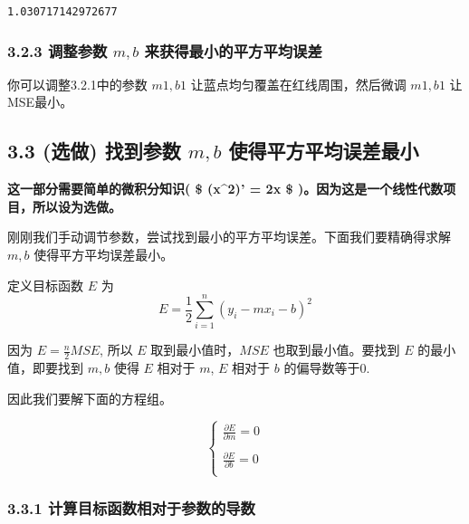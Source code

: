 \documentclass[11pt]{article}
\begin{document}
    \begin{Verbatim}[commandchars=\\\{\}]
1.030717142972677

    \end{Verbatim}

    \subsubsection{\texorpdfstring{3.2.3 调整参数 \(m, b\)
来获得最小的平方平均误差}{3.2.3 调整参数 m, b 来获得最小的平方平均误差}}\label{ux8c03ux6574ux53c2ux6570-m-b-ux6765ux83b7ux5f97ux6700ux5c0fux7684ux5e73ux65b9ux5e73ux5747ux8befux5dee}

你可以调整3.2.1中的参数 \(m1,b1\) 让蓝点均匀覆盖在红线周围，然后微调
\(m1, b1\) 让MSE最小。

    \subsection{\texorpdfstring{3.3 (选做) 找到参数 \(m, b\)
使得平方平均误差最小}{3.3 (选做) 找到参数 m, b 使得平方平均误差最小}}\label{ux9009ux505a-ux627eux5230ux53c2ux6570-m-b-ux4f7fux5f97ux5e73ux65b9ux5e73ux5747ux8befux5deeux6700ux5c0f}

\textbf{这一部分需要简单的微积分知识( \$ (x\^{}2)' = 2x \$
)。因为这是一个线性代数项目，所以设为选做。}

刚刚我们手动调节参数，尝试找到最小的平方平均误差。下面我们要精确得求解
\(m, b\) 使得平方平均误差最小。

定义目标函数 \(E\) 为 \[
E = \frac{1}{2}\sum_{i=1}^{n}{(y_i - mx_i - b)^2}
\]

因为 \(E = \frac{n}{2}MSE\), 所以 \(E\) 取到最小值时，\(MSE\)
也取到最小值。要找到 \(E\) 的最小值，即要找到 \(m, b\) 使得 \(E\) 相对于
\(m\), \(E\) 相对于 \(b\) 的偏导数等于0.

因此我们要解下面的方程组。

\[
\begin{cases}
\displaystyle
\frac{\partial E}{\partial m} =0 \\
\\
\displaystyle
\frac{\partial E}{\partial b} =0 \\
\end{cases}
\]

\subsubsection{3.3.1
计算目标函数相对于参数的导数}\label{ux8ba1ux7b97ux76eeux6807ux51fdux6570ux76f8ux5bf9ux4e8eux53c2ux6570ux7684ux5bfcux6570}
\end{document}
